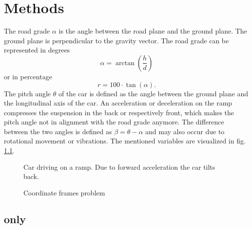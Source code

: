 \chapter{Methods}
\label{ch:Methods}
The road grade $\alpha$ is the angle between the road plane and the ground plane.
The ground plane is perpendicular to the gravity vector.
The road grade can be represented in degrees
\begin{equation}
    \alpha = \arctan(\frac{h}{d})
\end{equation}
or in percentage
\begin{equation}
    r = 100\cdot\tan(\alpha).
\end{equation}
The pitch angle $\theta$ of the car is defined as the angle between the ground plane and the longitudinal axis of the car.
An acceleration or deceleration on the ramp compresses the suspension in the back or respectively front, which makes the pitch angle not in alignment with the road grade anymore.
The difference between the two angles is defined as $\beta = \theta - \alpha$ and may also occur due to rotational movement or vibrations.
The mentioned variables are visualized in fig. \ref{fig:tikz_car_tilt}.

\begin{figure}[htpb]
    \centering
	
	\caption{Car driving on a ramp. Due to forward acceleration the car tilts back.}
	\label{fig:tikz_car_tilt}
\end{figure}
\begin{figure}[htpb]
    \centering
    
	\caption{Coordinate frames problem}
    \label{fig:tikz_car_frames}
\end{figure}



\section{ only}
